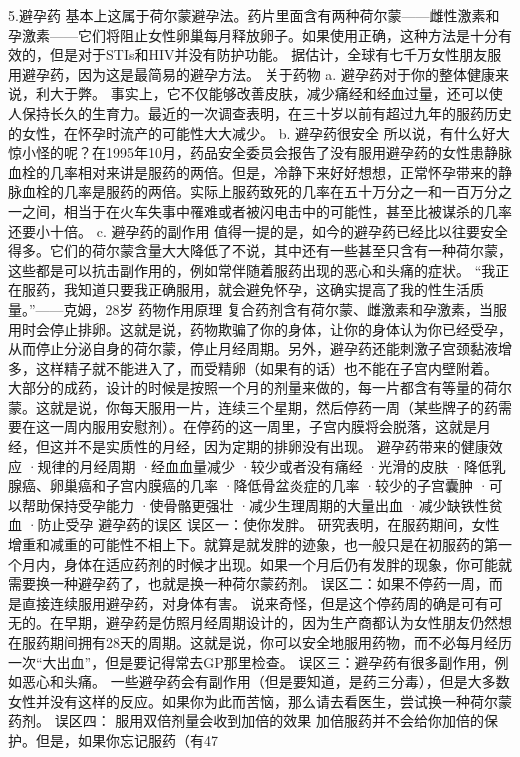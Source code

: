 \documentclass[12pt,UTF8,openany]{ctexbook}
\begin{document}
5.避孕药
基本上这属于荷尔蒙避孕法。药片里面含有两种荷尔蒙——雌性激素和孕激素——它们将阻止女性卵巢每月释放卵子。如果使用正确，这种方法是十分有效的，但是对于STIs和HIV并没有防护功能。
据估计，全球有七千万女性朋友服用避孕药，因为这是最简易的避孕方法。
关于药物
a. 避孕药对于你的整体健康来说，利大于弊。
事实上，它不仅能够改善皮肤，减少痛经和经血过量，还可以使人保持长久的生育力。最近的一次调查表明，在三十岁以前有超过九年的服药历史的女性，在怀孕时流产的可能性大大减少。
b. 避孕药很安全
所以说，有什么好大惊小怪的呢？在1995年10月，药品安全委员会报告了没有服用避孕药的女性患静脉血栓的几率相对来讲是服药的两倍。但是，冷静下来好好想想，正常怀孕带来的静脉血栓的几率是服药的两倍。实际上服药致死的几率在五十万分之一和一百万分之一之间，相当于在火车失事中罹难或者被闪电击中的可能性，甚至比被谋杀的几率还要小十倍。
c. 避孕药的副作用
值得一提的是，如今的避孕药已经比以往要安全得多。它们的荷尔蒙含量大大降低了不说，其中还有一些甚至只含有一种荷尔蒙，这些都是可以抗击副作用的，例如常伴随着服药出现的恶心和头痛的症状。
“我正在服药，我知道只要我正确服用，就会避免怀孕，这确实提高了我的性生活质量。”——克姆，28岁
药物作用原理
复合药剂含有荷尔蒙、雌激素和孕激素，当服用时会停止排卵。这就是说，药物欺骗了你的身体，让你的身体认为你已经受孕，从而停止分泌自身的荷尔蒙，停止月经周期。另外，避孕药还能刺激子宫颈黏液增多，这样精子就不能进入了，而受精卵（如果有的话）也不能在子宫内壁附着。
大部分的成药，设计的时候是按照一个月的剂量来做的，每一片都含有等量的荷尔蒙。这就是说，你每天服用一片，连续三个星期，然后停药一周（某些牌子的药需要在这一周内服用安慰剂）。在停药的这一周里，子宫内膜将会脱落，这就是月经，但这并不是实质性的月经，因为定期的排卵没有出现。
避孕药带来的健康效应
·规律的月经周期
·经血血量减少
·较少或者没有痛经
·光滑的皮肤
·降低乳腺癌、卵巢癌和子宫内膜癌的几率
·降低骨盆炎症的几率
·较少的子宫囊肿
·可以帮助保持受孕能力
·使骨骼更强壮
·减少生理周期的大量出血
·减少缺铁性贫血
·防止受孕
避孕药的误区
误区一：使你发胖。
研究表明，在服药期间，女性增重和减重的可能性不相上下。就算是就发胖的迹象，也一般只是在初服药的第一个月内，身体在适应药剂的时候才出现。如果一个月后仍有发胖的现象，你可能就需要换一种避孕药了，也就是换一种荷尔蒙药剂。
误区二：如果不停药一周，而是直接连续服用避孕药，对身体有害。
说来奇怪，但是这个停药周的确是可有可无的。在早期，避孕药是仿照月经周期设计的，因为生产商都认为女性朋友仍然想在服药期间拥有28天的周期。这就是说，你可以安全地服用药物，而不必每月经历一次“大出血”，但是要记得常去GP那里检查。
误区三：避孕药有很多副作用，例如恶心和头痛。
一些避孕药会有副作用（但是要知道，是药三分毒），但是大多数女性并没有这样的反应。如果你为此而苦恼，那么请去看医生，尝试换一种荷尔蒙药剂。
误区四： 服用双倍剂量会收到加倍的效果
加倍服药并不会给你加倍的保护。但是，如果你忘记服药（有47%
\end{document}

